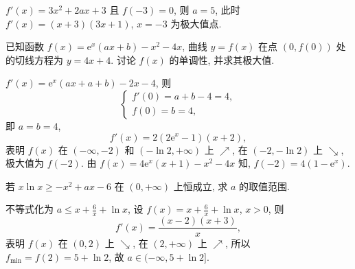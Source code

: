   \beginsolution
    $f'(x)=3x^2+2ax+3$ 且 $f(-3)=0$, 
    则 $a=5$, 此时 $f'(x)=(x+3)(3x+1)$, $x=-3$ 为极大值点.
  \endsolution
  
  \begin{exercise}
    已知函数 $f(x)=\mathrm{e}^x (ax+b)-x^2 -4x$, 曲线 $y=f(x)$ 
    在点 $(0,f(0))$ 处的切线方程为 $y=4x+4$. 讨论 $f(x)$ 的单调性,
    并求其极大值.
  \end{exercise}

  \beginsolution
    $f'(x)=\mathrm{e}^x(ax+a+b)-2x-4$, 则
    \[\left\{\!\!\begin{array}{l}
      f'(0)= a+b-4=4,\\
      f(0)= b=4,\end{array}\right.\]
    即 $a=b=4$, 
    \[f'(x)=2(2\mathrm{e}^x-1)(x+2),\] 表明 $f(x)$ 在 $(-\infty,-2)$ 和 $(-\ln2,+\infty)$ 上 $\nearrow$, 在 $(-2,-\ln2)$ 上 $\searrow$, 极大值为 $f(-2)$. 由 $f(x)=4\mathrm{e}^x(x+1)-x^2-4x$ 知, $f(-2)=4(1-\mathrm{e}^x)$.
  \endsolution

  \begin{exercise}
    若 $x\ln x\geqslant -x^2+ax-6$ 在 $(0,+\infty)$ 上恒成立, 求 $a$ 的取值范围.
  \end{exercise}

  \beginsolution
    不等式化为 $a\leqslant x+\frac6x+\ln x$, 
    设 $f(x)=x+\frac6x+\ln x$, $x>0$, 则 
    \[f'(x)=\frac{(x-2)(x+3)}x,\]
    表明 $f(x)$ 在 $(0,2)$ 上 $\searrow$, 在 $(2,+\infty)$ 上 $\nearrow$, 所以 $f_{\min}=f(2)=5+\ln 2$, 故 $a\in(-\infty,5+\ln2]$.
  \endsolution
